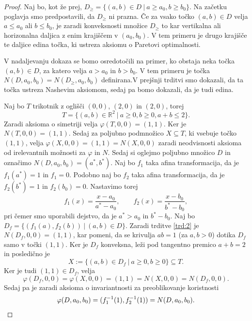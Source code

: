 \documentclass[10pt, a4paper]{article}
\newenvironment{noticeC}{%
  \tcolorbox[%
  notitle,
  empty,
  enhanced,  %
  breakable,
  coltext=black, 
  fontupper=\rmfamily,
  parbox=false,
  noparskip,
  sharp corners,
  boxrule=-1pt,  %
  frame hidden,
  left=7pt,  %
  right=7pt,
  top=5pt,
  bottom=5pt,
  before skip=2.5ex plus 2pt,
  after skip=2.5ex plus 2pt,
  overlay unbroken and last={%
  },
  ]}
{\endtcolorbox}
\newenvironment{dokaz}%
  {\begin{noticeC}\begin{proof}}%
  {\end{proof}\end{noticeC}}
\newcommand{\R}{\mathbb {R}}
\begin{document}
\begin{dokaz}
  Naj bo, kot že prej, $D_\geq = \{(a, b) \in D\ |\ a \geq a_0, b \geq b_0\}$.
  Na začetku poglavja smo predpostavili, da $D_\geq$ ni prazna.
  Če za vsako točko $(a, b) \in D$ velja $a \leq a_0$ ali $b \leq b_0$,
  je zaradi konveksnosti množice $D_\geq$ to kar vertikalna ali horizonalna daljica
  z enim krajiščem v $(a_0, b_0)$. V tem primeru je drugo krajišče te daljice edina 
  točka, ki ustreza aksiomu o Paretovi optimalnosti.
  
  V nadaljevanju dokaza se bomo osredotočili na primer,
  ko obstaja neka točka $(a, b) \in D$, za katero velja $a > a_0$
  in $b > b_0$. V tem primeru je točka $N(D, a_0, b_0) = N(D_\geq, a_0, b_0)$
  definirana.V prejšnji trditvi smo dokazali, da ta točka ustreza Nashevim aksiomom,
  sedaj pa bomo dokazali, da je tudi edina.

  Naj bo $T$ trikotnik z oglišči $(0, 0)$, $(2, 0)$ in $(2, 0)$, torej 
  $$T = \{(a, b) \in \R^2\ |\ a \geq 0, b\geq 0, a + b \leq 2\}.$$
  Zaradi aksioma o simetriji velja $\varphi(T, 0, 0) = (1, 1)$.
  Ker je $N(T, 0, 0) = (1, 1)$. Sedaj za poljubno podmnožico $X \subseteq T$,
  ki vsebuje točko $(1, 1)$, velja $\varphi(X, 0, 0) = (1, 1) = N(X, 0, 0)$
  zaradi neodvisnosti aksioma od irelevantnih možnosti za $\varphi$ in $N$.
  Sedaj si oglejmo poljubno množico $D$ in označimo $N(D, a_0, b_0) = (a^*, b^*)$.
  Naj bo $f_1$ taka afina transformacija, da je $f_1 (a^*) = 1$ in $f_1 = 0$.
  Podobno naj bo $f_2$ taka afina transformacija, da je $f_2 (b^*) = 1$ in $f_2(b_0) = 0.$
  Nastavimo torej 
  $$f_1 (x) = \frac{x - a_0}{a^* - a_0},\qquad f_2(x) = \frac{x - b_0}{b^* - b_0},$$
  pri čemer smo uporabili dejstvo, da je $a^* > a_0$ in $b^* - b_0$.
  Naj bo $D_f = \{(f_1(a), f_2(b))\ |\ (a, b) \in D\}$.
  Zaradi trditve \ref{trd:2} je $N(D_f, 0, 0) = (1, 1)$, kar pomeni,
  da se krivulja $ab = 1$ (za $a, b > 0$) dotika $D_f$
  samo v točki $(1, 1)$. Ker je $D_f$ konveksna, leži pod 
  tangentno premico $a + b = 2$ in posledično je 
  $$X := \{(a, b) \in D_f\ |\ a \geq 0, b\geq 0\} \subseteq T.$$
  Ker je tudi $(1, 1) \in D_f$, velja 
  $$\varphi(D_f, 0, 0) = \varphi(X, 0, 0) = (1, 1) = N(X, 0, 0) = N(D_f, 0, 0).$$
  Sedaj pa je zaradi aksioma o invariantnosti za preoblikovanje koristnosti
  \begin{equation*}
    \varphi(D, a_0, b_0) = (f_1^{-1} (1), f_2^{-1} (1)) = N(D, a_0, b_0). \qedhere
  \end{equation*}
\end{dokaz}
\end{document}
